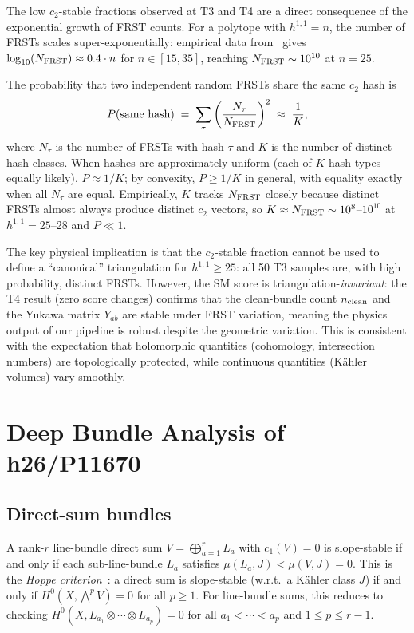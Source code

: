\documentclass[11pt,a4paper]{article}
\begin{document}
The low $c_2$-stable fractions observed at T3 and T4 are a direct
consequence of the exponential growth of FRST counts.
For a polytope with $h^{1,1}=n$, the number of FRSTs scales
super-exponentially: empirical data from~\cite{AltmanCarifio2021}
gives $\log_{10}(N_{\rm FRST}) \approx 0.4 \cdot n$ for
$n \in [15, 35]$, reaching $N_{\rm FRST} \sim 10^{10}$ at $n=25$.

The probability that two independent random FRSTs share the same
$c_2$ hash is
\begin{equation}
  P(\text{same hash}) \;=\; \sum_\tau \left(\frac{N_\tau}{N_{\rm FRST}}\right)^2
    \;\approx\; \frac{1}{K},
  \label{eq:hash_prob}
\end{equation}
where $N_\tau$ is the number of FRSTs with hash $\tau$ and
$K$ is the number of distinct hash classes.
When hashes are approximately uniform (each of $K$ hash types
equally likely), $P \approx 1/K$; by convexity, $P \geq 1/K$ in
general, with equality exactly when all $N_\tau$ are equal.
Empirically, $K$ tracks $N_{\rm FRST}$ closely because distinct FRSTs
almost always produce distinct $c_2$ vectors, so
$K \approx N_{\rm FRST} \sim 10^{8}$--$10^{10}$ at $h^{1,1}=25$--28
and $P \ll 1$.

The key physical implication is that the $c_2$-stable fraction
cannot be used to define a ``canonical'' triangulation for
$h^{1,1} \geq 25$: all 50 T3 samples are, with high probability,
distinct FRSTs.
However, the SM score is triangulation-\emph{invariant}: the T4
result (zero score changes) confirms that the clean-bundle count
$n_{\rm clean}$ and the Yukawa matrix $Y_{ab}$ are stable under
FRST variation, meaning the physics output of our pipeline is
robust despite the geometric variation.
This is consistent with the expectation that holomorphic
quantities (cohomology, intersection numbers) are topologically
protected, while continuous quantities (K\"{a}hler volumes)
vary smoothly.

\section{Deep Bundle Analysis of h26/P11670}
\label{sec:bundles}

\subsection{Direct-sum bundles}

A rank-$r$ line-bundle direct sum $V = \bigoplus_{a=1}^r L_a$
with $c_1(V)=0$ is slope-stable if and only if
each sub-line-bundle $L_a$ satisfies
$\mu(L_a,J) < \mu(V,J) = 0$.
This is the \emph{Hoppe criterion}~\cite{Hoppe1984}:
a direct sum is slope-stable
(w.r.t.\ a K\"{a}hler class $J$) if and only if
$H^0(X, {\textstyle\bigwedge}^p V) = 0$ for all $p \geq 1$.
For line-bundle sums, this reduces to checking
$H^0(X, L_{a_1}\otimes\cdots\otimes L_{a_p}) = 0$
for all $a_1 < \cdots < a_p$ and $1 \leq p \leq r-1$.
\end{document}

